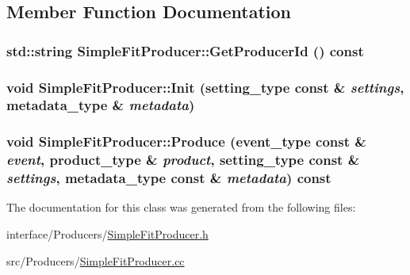 \subsection{Member Function Documentation}
\hypertarget{classSimpleFitProducer_a53d443c44930735b041a4bb8d81f38ce}{
\subsubsection[{GetProducerId}]{\setlength{\rightskip}{0pt plus 5cm}std::string SimpleFitProducer::GetProducerId () const}}
\label{classSimpleFitProducer_a53d443c44930735b041a4bb8d81f38ce}
\hypertarget{classSimpleFitProducer_a9fa8016129118263dac392e16dc90e97}{
\subsubsection[{Init}]{\setlength{\rightskip}{0pt plus 5cm}void SimpleFitProducer::Init (setting\_\-type const \& {\em settings}, \/  metadata\_\-type \& {\em metadata})}}
\label{classSimpleFitProducer_a9fa8016129118263dac392e16dc90e97}
\hypertarget{classSimpleFitProducer_a32bddf546ffca324de60747761079e6c}{
\subsubsection[{Produce}]{\setlength{\rightskip}{0pt plus 5cm}void SimpleFitProducer::Produce (event\_\-type const \& {\em event}, \/  product\_\-type \& {\em product}, \/  setting\_\-type const \& {\em settings}, \/  metadata\_\-type const \& {\em metadata}) const}}
\label{classSimpleFitProducer_a32bddf546ffca324de60747761079e6c}


The documentation for this class was generated from the following files:\begin{DoxyCompactItemize}
\item 
interface/Producers/\hyperlink{SimpleFitProducer_8h}{SimpleFitProducer.h}\item 
src/Producers/\hyperlink{SimpleFitProducer_8cc}{SimpleFitProducer.cc}\end{DoxyCompactItemize}
